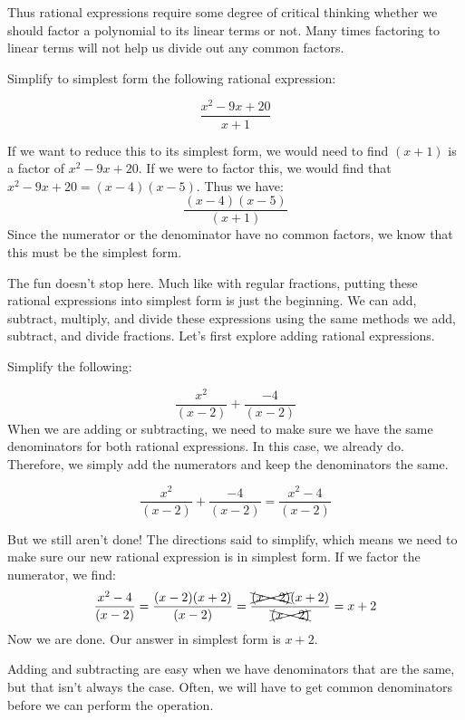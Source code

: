 Thus rational expressions require some degree of critical thinking whether we should factor a polynomial to its linear terms or not. Many times factoring to linear terms will not help us divide out any common factors.

\begin{example}
Simplify to simplest form the following rational expression:

\[
\frac{x^2-9x+20}{x+1}
\]	

If we want to reduce this to its simplest form, we would need to find $(x+1)$ is a factor of $x^2-9x+20$. If we were to factor this, we would find that $x^2-9x+20= (x-4)(x-5)$. Thus we have:
\[
\frac{(x-4)(x-5)}{(x+1)}
\]
Since the numerator or the denominator have no common factors, we know that this must be the simplest form. 
\end{example}

The fun doesn't stop here. Much like with regular fractions, putting these rational expressions into simplest form is just the beginning. We can add, subtract, multiply, and divide these expressions using the same methods we add, subtract, and divide fractions. Let's first explore adding rational expressions.

\begin{example}
Simplify the following:

\[
\frac{x^2}{(x-2)}+\frac{-4}{(x-2)}
\]
When we are adding or subtracting, we need to make sure we have the same denominators for both rational expressions. In this case, we already do. Therefore, we simply add the numerators and keep the denominators the same. 

\[
\frac{x^2}{(x-2)}+\frac{-4}{(x-2)}=\frac{x^2-4}{(x-2)}
\]

But we still aren't done! The directions said to simplify, which means we need to make sure our new rational expression is in simplest form. If we factor the numerator, we find:
\[
\frac{x^2-4}{(x-2)}=\frac{(x-2)(x+2)}{(x-2)}=\frac{\xcancel{(x-2)}(x+2)}{\xcancel{(x-2)}}=x+2
\]
Now we are done. Our answer in simplest form is $x+2$.
\end{example}

Adding and subtracting are easy when we have denominators that are the same, but that isn't always the case. Often, we will have to get common denominators before we can perform the operation. 

